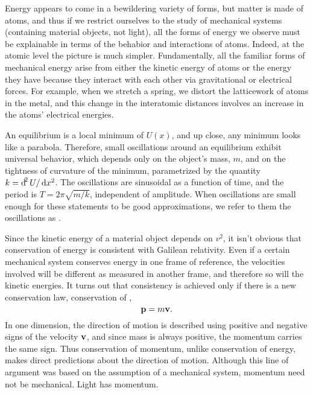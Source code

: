 	Energy appears to come in a bewildering variety of forms, but matter is made of
	atoms, and thus if we restrict ourselves to the study of mechanical systems
	(containing material objects, not light), all the forms of energy we observe
	must be explainable in terms of the behabior and interactions of atoms. Indeed,
	at the atomic level the picture is much simpler. Fundamentally, all the familiar forms of
	mechanical energy arise from either the kinetic energy of atoms or the energy
	they have because they interact with each other via gravitational or electrical
	forces. For example, when we stretch a spring, we distort the latticework of
	atoms in the metal, and this change in the interatomic distances involves an
	increase in the atoms' electrical energies.
	
	An equilibrium is a local minimum of $U(x)$, and up close, any minimum
	looks like a parabola. Therefore, small oscillations around
	an equilibrium exhibit universal behavior, which depends only on the object's
	mass, $m$, and on the tightness of curvature of the minimum, parametrized
	by the quantity $k=\operatorname{d\!}^2U/\operatorname{d\!} x^2$. The oscillations are sinusoidal
	as a function of time, and the period is $T=2\pi\sqrt{m/k}$, independent
	of amplitude. When oscillations are small enough for these statements to
	be good approximations, we refer to them the oscillations as
	.
	
	Since the kinetic energy of a material object depends on $v^2$, it isn't obvious
	that conservation of energy is consistent with Galilean relativity. Even if
	a certain mechanical system conserves energy in one frame of reference, the
	velocities involved will be different as measured in another frame, and therefore
	so will the kinetic energies. It turns out that consistency is achieved only
	if there is a new conservation law, conservation of ,
	\begin{equation*}
		\mathbf{p} = m\mathbf{v}.
	\end{equation*}
	In one dimension, the direction of motion is described using positive and negative
	signs of the velocity $\mathbf{v}$, and since mass is always positive, the momentum
	carries the same sign. Thus conservation of momentum, unlike conservation of
	energy, makes direct predictions about the direction of motion.
	Although this line of argument was based on the assumption of a mechanical
	system, momentum need not be mechanical. Light has momentum.
	
